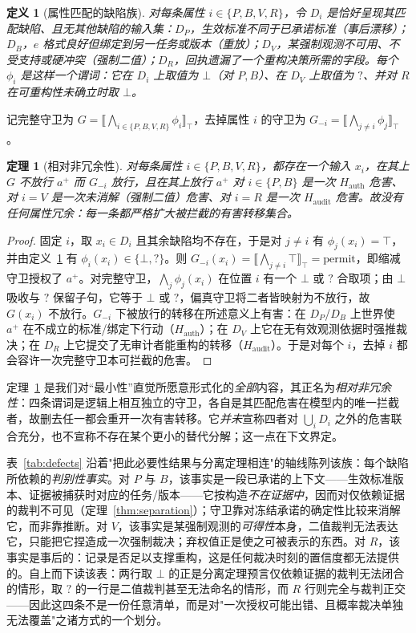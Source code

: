 \documentclass[11pt]{ctexart}
\newtheorem{theorem}{定理}
\newtheorem{definition}{定义}
\begin{document}
\begin{definition}[属性匹配的缺陷族]
\label{def:defects}
对每条属性 $i\in\{P,B,V,R\}$，令 $D_i$ 是恰好呈现其匹配缺陷、且无其他缺陷的输入集：$D_P$，生效标准不同于已承诺标准（事后漂移）；$D_B$，$e$ 格式良好但绑定到另一任务或版本（重放）；$D_V$，某强制观测不可用、不受支持或硬冲突（强制二值）；$D_R$，回执遗漏了一个重构决策所需的字段。每个 $\phi_i$ 是这样一个谓词：它在 $D_i$ 上取值为 $\bot$（对 $P,B$）、在 $D_V$ 上取值为 $?$、并对 $R$ 在可重构性未确立时取 $\bot$。
\end{definition}

记完整守卫为 $G=\llbracket\bigwedge_{i\in\{P,B,V,R\}}\phi_i\rrbracket_\top$，去掉属性 $i$ 的守卫为 $G_{-i}=\llbracket\bigwedge_{j\neq i}\phi_j\rrbracket_\top$。

\begin{theorem}[相对非冗余性]
\label{thm:necessity}
对每条属性 $i\in\{P,B,V,R\}$，都存在一个输入 $x_i$，在其上 $G$ 不放行 $a^+$ 而 $G_{-i}$ 放行，且在其上放行 $a^+$ 对 $i\in\{P,B\}$ 是一次 $H_{\mathrm{auth}}$ 危害、对 $i=V$ 是一次未消解（强制二值）危害、对 $i=R$ 是一次 $H_{\mathrm{audit}}$ 危害。故没有任何属性冗余：每一条都严格扩大被拦截的有害转移集合。
\end{theorem}
\begin{proof}
固定 $i$，取 $x_i\in D_i$ 且其余缺陷均不存在，于是对 $j\neq i$ 有 $\phi_j(x_i)=\top$，并由定义~\ref{def:defects} 有 $\phi_i(x_i)\in\{\bot,?\}$。则 $G_{-i}(x_i)=\llbracket\bigwedge_{j\neq i}\top\rrbracket_\top=\text{permit}$，即缩减守卫授权了 $a^+$。对完整守卫，$\bigwedge_j\phi_j(x_i)$ 在位置 $i$ 有一个 $\bot$ 或 $?$ 合取项；由 $\bot$ 吸收与 $?$ 保留子句，它等于 $\bot$ 或 $?$，偏真守卫将二者皆映射为不放行，故 $G(x_i)$ 不放行。$G_{-i}$ 下被放行的转移在所述意义上有害：在 $D_P$/$D_B$ 上世界使 $a^+$ 在不成立的标准/绑定下行动（$H_{\mathrm{auth}}$）；在 $D_V$ 上它在无有效观测依据时强推裁决；在 $D_R$ 上它提交了无审计者能重构的转移（$H_{\mathrm{audit}}$）。于是对每个 $i$，去掉 $i$ 都会容许一次完整守卫本可拦截的危害。
\end{proof}

定理~\ref{thm:necessity} 是我们对“最小性”直觉所愿意形式化的\emph{全部}内容，其正名为\emph{相对非冗余性}：四条谓词是逻辑上相互独立的守卫，各自是其匹配危害在模型内的唯一拦截者，故删去任一都会重开一次有害转移。它\emph{并未}宣称四者对 $\bigcup_i D_i$ 之外的危害联合充分，也不宣称不存在某个更小的替代分解；这一点在下文界定。

表~\ref{tab:defects} 沿着"把此必要性结果与分离定理相连"的轴线陈列该族：每个缺陷所依赖的\emph{判别性事实}。对 $P$ 与 $B$，该事实是一段已承诺的上下文——生效标准版本、证据被捕获时对应的任务/版本——它按构造\emph{不在证据中}，因而对仅依赖证据的裁判不可见（定理~\ref{thm:separation}）；守卫靠对冻结承诺的确定性比较来消解它，而非靠推断。对 $V$，该事实是某强制观测的\emph{可得性}本身，二值裁判无法表达它，只能把它捏造成一次强制裁决；弃权值正是使之可被表示的东西。对 $R$，该事实是事后的：记录是否足以支撑重构，这是任何裁决时刻的置信度都无法提供的。自上而下读该表：两行取 $\bot$ 的正是分离定理预言仅依赖证据的裁判无法闭合的情形，取 $?$ 的一行是二值裁判甚至无法命名的情形，而 $R$ 行则完全与裁判正交——因此这四条不是一份任意清单，而是对"一次授权可能出错、且概率裁决单独无法覆盖"之诸方式的一个划分。
\end{document}
